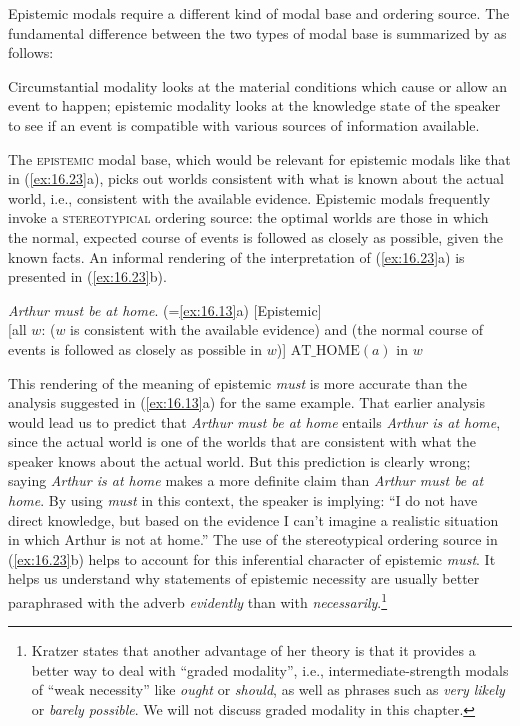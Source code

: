 Epistemic modals require a different kind of modal base and ordering source. The fundamental difference between the two types of modal base is summarized by \citet[1494]{Hacquard2011} as follows:


\begin{modquote}
Circumstantial modality looks at the material conditions which cause or allow an event to happen; epistemic modality looks at the knowledge state of the speaker to see if an event is compatible with various sources of information available.
\end{modquote}
 

The \textsc{epistemic} modal base, which would be relevant for epistemic modals like that in (\ref{ex:16.23}a), picks out worlds consistent with what is known about the actual world, i.e., consistent with the available evidence. Epistemic modals frequently invoke a \textsc{stereotypical} ordering source: the optimal worlds are those in which the normal, expected course of events is followed as closely as possible, given the known facts. An informal rendering of the interpretation of (\ref{ex:16.23}a) is presented in (\ref{ex:16.23}b).


\ea \label{ex:16.23}
\ea  \textit{Arthur must be at home}. (=\ref{ex:16.13}a) \hfill [Epistemic]  \\
\ex{} [all $w$: ($w$ is consistent with the available evidence) and (the normal course of events is followed as closely as possible in $w$)] $\text{AT\_HOME}(a)$ in $w$
\z
\z
 
\largerpage[-1]
This rendering of the meaning of epistemic \textit{must} is more accurate than the analysis suggested in (\ref{ex:16.13}a) for the same example. That earlier analysis would lead us to predict that \textit{Arthur must be at home} entails \textit{Arthur is at home}, since the actual world is one of the worlds that are consistent with what the speaker knows about the actual world. But this prediction is clearly wrong; saying \textit{Arthur is at home} makes a more definite claim than \textit{Arthur must be at home}. By using \textit{must} in this context, the speaker is implying: “I do not have direct knowledge, but based on the evidence I can’t imagine a realistic situation in which Arthur is not at home.” The use of the stereotypical ordering source in (\ref{ex:16.23}b) helps to account for this inferential character of epistemic \textit{must}. It helps us understand why statements of epistemic necessity are usually better paraphrased with the adverb \textit{evidently} than with \textit{necessarily}.\footnote{Kratzer states that another advantage of her theory is that it provides a better way to deal with “graded modality”, i.e., intermediate-strength modals of “weak necessity” like \textit{ought} or \textit{should}, as well as phrases such as \textit{very likely} or \textit{barely possible}. We will not discuss graded modality in this chapter.}



